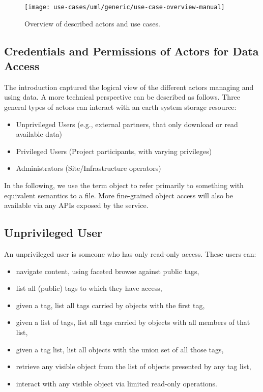 \begin{figure}
	\centering
	\texttt{[image: use-cases/uml/generic/use-case-overview-manual]}
	\caption{Overview of described actors and use cases.}
	\label{fig:overview-actors-use-cases}
\end{figure}





\subsection{Credentials and Permissions of Actors for Data Access}

The introduction captured the logical view of the different actors managing and using data.
A more technical perspective can be described as follows.
Three general types of actors can interact with an earth system storage resource:

\begin{itemize}
	\item Unprivileged Users (e.g., external partners, that only download or read available data)
	\item Privileged Users (Project participants, with varying privileges)
	\item Administrators (Site/Infrastructure operators)
\end{itemize}

In the following, we use the term object to refer primarily to something with equivalent semantics to a file.
More fine-grained object access will also be available via any APIs exposed by the service.

\subsection*{Unprivileged User}

An unprivileged user is someone who has only read-only access. These users can:
\begin{itemize}
	\item navigate content, using faceted browse against public tags,
	\item list all (public) tags to which they have access,
	\item given a tag, list all tags carried by objects with the first tag,
	\item given a list of tags, list all tags carried by objects with all members of that list,
	\item given a tag list, list all objects with the union set of all those tags,
	\item retrieve any visible object from the list of objects presented by any tag list,
	\item interact with any visible object via limited read-only operations.
\end{itemize}

